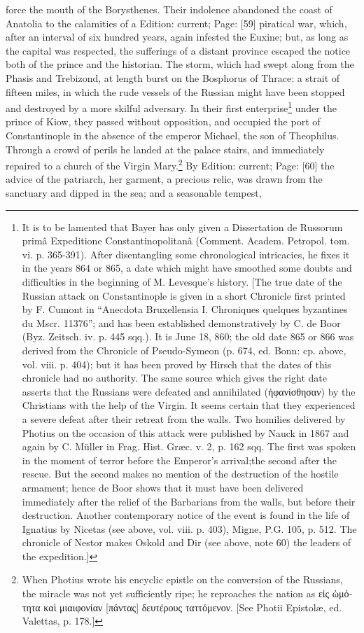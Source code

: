 force the mouth of the Borysthenes. Their indolence abandoned the coast of Anatolia to the calamities of a Edition: current; Page: [59] piratical war, which, after an interval of six hundred years, again infested the Euxine; but, as long as the capital was respected, the sufferings of a distant province escaped the notice both of the prince and the historian. The storm, which had swept along from the Phasis and Trebizond, at length burst on the Bosphorus of Thrace: a strait of fifteen miles, in which the rude vessels of the Russian might have been stopped and destroyed by a more skilful adversary. In their first enterprise\footnote{It is to be lamented that Bayer has only given a Dissertation de Russorum primâ Expeditione Constantinopolitanâ (Comment. Academ. Petropol. tom. vi. p. 365-391). After disentangling some chronological intricacies, he fixes it in the years 864 or 865, a date which might have smoothed some doubts and difficulties in the beginning of M. Levesque\texthebrew{}’s history. [The true date of the Russian attack on Constantinople is given in a short Chronicle first printed by F. Cumont in \texthebrew{“}Anecdota Bruxellensia I. Chroniques quelques byzantines du Mscr. 11376\texthebrew{}”; and has been established demonstratively by C. de Boor (Byz. Zeitsch. iv. p. 445 sqq.). It is June 18, 860; the old date 865 or 866 was derived from the Chronicle of Pseudo-Symeon (p. 674, ed. Bonn: cp. above, vol. viii. p. 404); but it has been proved by Hirsch that the dates of this chronicle had no authority. The same source which gives the right date asserts that the Russians were defeated and annihilated (\textgreek{\texthebrew{ἠ}φανίσθησαν}) by the Christians with the help of the Virgin. It seems certain that they experienced a severe defeat after their retreat from the walls. Two homilies delivered by Photius on the occasion of this attack were published by Nauck in 1867 and again by C. Müller in Frag. Hist. Græc. v. 2, p. 162 sqq. The first was spoken in the moment of terror before the Emperor\texthebrew{}’s arrival;the second after the rescue. But the second makes no mention of the destruction of the hostile armament; hence de Boor shows that it must have been delivered immediately after the relief of the Barbarians from the walls, but before their destruction. Another contemporary notice of the event is found in the life of Ignatius by Nicetas (see above, vol. viii. p. 403), Migne, P.G. 105, p. 512. The chronicle of Nestor makes Oskold and Dir (see above, note 60) the leaders of the expedition.]} under the prince of Kiow, they passed without opposition, and occupied the port of Constantinople in the absence of the emperor Michael, the son of Theophilus. Through a crowd of perils he landed at the palace stairs, and immediately repaired to a church of the Virgin Mary.\footnote{When Photius wrote his encyclic epistle on the conversion of the Russians, the miracle was not yet sufficiently ripe; he reproaches the nation as \textgreek{ε\texthebrew{ἰ}ς \texthebrew{ὠ}μότητα κα\texthebrew{ὶ} μιαιφονίαν} [\textgreek{πάντας}] \textgreek{δευτέρους ταττόμενον}. [See Photii Epistolæ, ed. Valettas, p. 178.]} By Edition: current; Page: [60] the advice of the patriarch, her garment, a precious relic, was drawn from the sanctuary and dipped in the sea; and a seasonable tempest, 